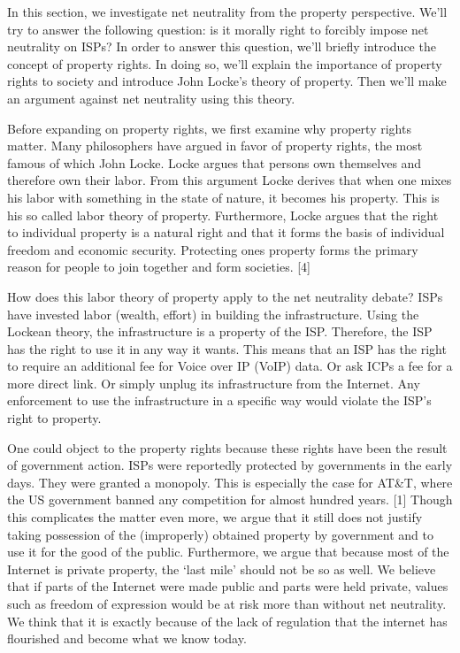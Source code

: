 
In this section, we investigate net neutrality from the property perspective. We'll try to answer the following question: is it morally right to forcibly impose net neutrality on \acp{ISP}? In order to answer this question, we'll briefly introduce the concept of property rights. In doing so, we'll explain the importance of property rights to society and introduce John Locke's theory of property. Then we'll make an argument against net neutrality using this theory.

Before expanding on property rights, we first examine why property rights matter. Many philosophers have argued in favor of property rights, the most famous of which John Locke. Locke argues that persons own themselves and therefore own their labor. From this argument Locke derives that when one mixes his labor with something in the state of nature, it becomes his property. This is his so called labor theory of property. Furthermore, Locke argues that the right to individual property is a natural right and that it forms the basis of individual freedom and economic security. Protecting ones property forms the primary reason for people to join together and form societies. [4]

How does this labor theory of property apply to the net neutrality debate? \acp{ISP} have invested labor (wealth, effort) in building the infrastructure. Using the Lockean theory, the infrastructure is a property of the \ac{ISP}. Therefore, the \ac{ISP} has the right to use it in any way it wants. This means that an \ac{ISP} has the right to require an additional fee for Voice over IP (VoIP) data. Or ask ICPs a fee for a more direct link. Or simply unplug its infrastructure from the Internet. Any enforcement to use the infrastructure in a specific way would violate the \ac{ISP}'s right to property.

One could object to the property rights because these rights have been the result of government action. \acp{ISP} were reportedly protected by governments in the early days. They were granted a monopoly. This is especially the case for AT\&T, where the US government banned any competition for almost hundred years. [1] Though this complicates the matter even more, we argue that it still does not justify taking possession of the (improperly) obtained property by government and to use it for the good of the public. Furthermore, we argue that because most of the Internet is private property, the `last mile' should not be so as well. We believe that if parts of the Internet were made public and parts were held private, values such as freedom of expression would be at risk more than without net neutrality. We think that it is exactly because of the lack of regulation that the internet has flourished and become what we know today.

